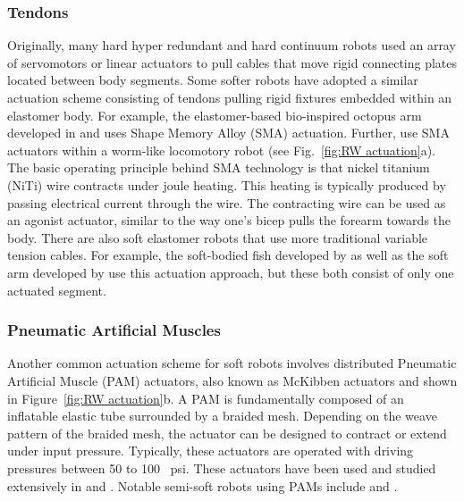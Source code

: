 \subsubsection{Tendons}
\label{subsubsec:RW Tendons}
Originally, many hard hyper redundant and hard continuum robots \citep{cieslak1999elephant, buckingham2002snake, gravagne2002uniform, hannan2003kinematics, mcmahan2005design, camarillo2009configuration} used an array of servomotors or linear actuators to pull cables that move rigid connecting plates located between body segments.
Some softer robots have adopted a similar actuation scheme consisting of tendons pulling rigid fixtures embedded within an elastomer body.
For example, the elastomer-based bio-inspired octopus arm developed in  \citet{calisti2010study, laschi2012soft} and \citet{calisti2011octopus} uses Shape Memory Alloy (SMA) actuation.
Further, \citet{seok2010peristaltic} use SMA actuators within a worm-like locomotory robot (see Fig.~\ref{fig:RW actuation}a).
The basic operating principle behind SMA technology is that nickel titanium (NiTi) wire contracts under joule heating.
This heating is typically produced by passing electrical current through the wire.
The contracting wire can be used as an agonist actuator, similar to the way one's bicep pulls the forearm towards the body.
There are also soft elastomer robots that use more traditional variable tension cables.
For example, the soft-bodied fish developed by \citet{youcef2006design} as well as the soft arm developed by \citet{wang2013visual} use this actuation approach, but these both consist of only one actuated segment.

\subsubsection{Pneumatic Artificial Muscles}
\label{subsubsec:RW PMA}
Another common actuation scheme for soft robots involves distributed Pneumatic Artificial Muscle (PAM) actuators, also known as McKibben actuators and shown in Figure~\ref{fig:RW actuation}b.
A PAM is fundamentally composed of an inflatable elastic tube surrounded by a braided mesh.
Depending on the weave pattern of the braided mesh, the actuator can be designed to contract or extend under input pressure.
Typically, these actuators are operated with driving pressures between 50 to 100 ~psi.
These actuators have been used and studied extensively in \citet{chou1996measurement, tondu2000modeling} and \citet{daerden2002pneumatic}.
Notable semi-soft robots using PAMs include \citet{mcmahan2006field, pritts2004design} and \citet{kang2013design}.

